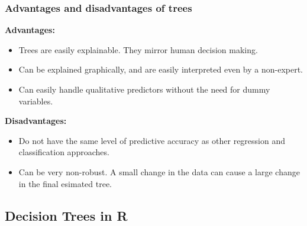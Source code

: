 \documentclass[11pt]{article}
\begin{document}
\subsubsection{Advantages and disadvantages of trees}
\noindent \textbf{Advantages:}
\begin{itemize}
    \item Trees are easily explainable. They mirror human decision making.
    \item Can be explained graphically, and are easily interpreted even by a non-expert.
    \item Can easily handle qualitative predictors without the need for dummy variables.
\end{itemize} \phantom{i}

\noindent \textbf{Disadvantages:}
\begin{itemize}
    \item Do not have the same level of predictive accuracy as other regression and classification approaches.
    \item Can be very non-robust. A small change in the data can cause a large change in the final esimated tree.
\end{itemize}

\subsection{Decision Trees in R}
\end{document}
